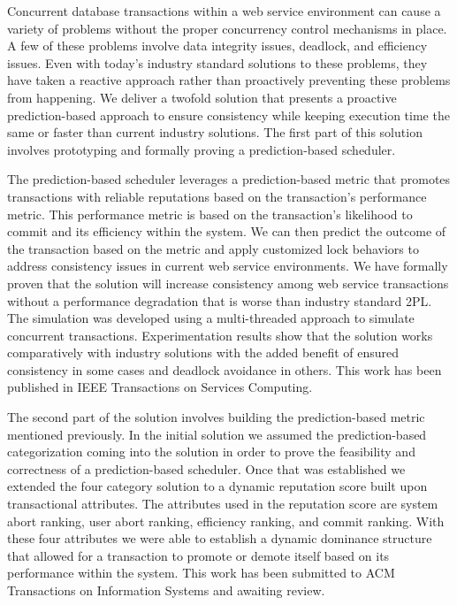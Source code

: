 Concurrent database transactions within a web service environment can cause a variety of problems without the proper concurrency control mechanisms in place. A few of these problems involve data integrity issues, deadlock, and efficiency issues. Even with today's industry standard solutions to these problems, they have taken a reactive approach rather than proactively preventing these problems from happening. We deliver a twofold solution that presents a proactive prediction-based approach to ensure consistency while keeping execution time the same or faster than current industry solutions. The first part of this solution involves prototyping and formally proving a prediction-based scheduler.

The prediction-based scheduler leverages a prediction-based metric that promotes transactions with reliable reputations based on the transaction's performance metric. This performance metric is based on the transaction's likelihood to commit and its efficiency within the system. We can then predict the outcome of the transaction based on the metric and apply customized lock behaviors to address consistency issues in current web service environments. We have formally proven that the solution will increase consistency among web service transactions without a performance degradation that is worse than industry standard 2PL. The simulation was developed using a multi-threaded approach to simulate concurrent transactions.  Experimentation  results  show  that the solution works comparatively with industry solutions with the added benefit of ensured consistency in some cases and deadlock avoidance in others. This work has been published in IEEE Transactions on Services Computing.

The second part of the solution involves building the prediction-based metric mentioned previously. In the initial solution we assumed the prediction-based categorization coming into the solution in order to prove the feasibility and correctness of a prediction-based scheduler.
Once that was established we extended the four category solution to a dynamic reputation score built upon transactional attributes. The attributes used in the reputation score are system abort ranking, user abort ranking, efficiency ranking, and commit ranking. With these four attributes we were able to establish a dynamic dominance structure that allowed for a transaction to promote or demote itself based on its performance within the system. This work has been submitted to ACM Transactions on Information Systems and awaiting review.

